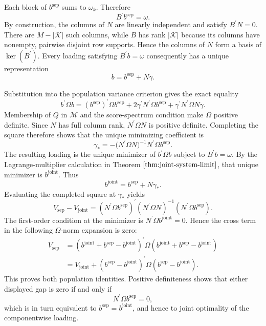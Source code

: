 Each block of \(b^{\mathrm{sep}}\) sums to \(\omega_k\). Therefore
\[
B^{\prime}b^{\mathrm{sep}}=\omega.
\]
By construction, the columns of \(N\) are linearly independent and satisfy \(B^{\prime}N=0\). There are \(M-|\mathcal K|\) such columns, while \(B\) has rank \(|\mathcal K|\) because its columns have nonempty, pairwise disjoint row supports. Hence the columns of \(N\) form a basis of \(\ker(B^{\prime})\). Every loading satisfying \(B^{\prime}b=\omega\) consequently has a unique representation
\[
b=b^{\mathrm{sep}}+N\gamma.
\]

Substitution into the population variance criterion gives the exact equality
\[
b^{\prime}\Omega b
=(b^{\mathrm{sep}})^{\prime}\Omega b^{\mathrm{sep}}
+2\gamma^{\prime}N^{\prime}\Omega b^{\mathrm{sep}}
+\gamma^{\prime}N^{\prime}\Omega N\gamma.
\]
Membership of \(Q\) in \(\mathcal M\) and the score-spectrum condition make \(\Omega\) positive definite. Since \(N\) has full column rank, \(N^{\prime}\Omega N\) is positive definite. Completing the square therefore shows that the unique minimizing coefficient is
\[
\gamma_*=-\bigl(N^{\prime}\Omega N\bigr)^{-1}N^{\prime}\Omega b^{\mathrm{sep}}.
\]
The resulting loading is the unique minimizer of \(b^{\prime}\Omega b\) subject to \(B^{\prime}b=\omega\). By the Lagrange-multiplier calculation in Theorem \(\ref{thm:joint-system-limit}\), that unique minimizer is \(b^{\mathrm{joint}}\). Thus
\[
b^{\mathrm{joint}}=b^{\mathrm{sep}}+N\gamma_*.
\]
Evaluating the completed square at \(\gamma_*\) yields
\[
V_{\mathrm{sep}}-V_{\mathrm{joint}}
=(N^{\prime}\Omega b^{\mathrm{sep}})^{\prime}
 (N^{\prime}\Omega N)^{-1}
 (N^{\prime}\Omega b^{\mathrm{sep}}).
\]
The first-order condition at the minimizer is \(N^{\prime}\Omega b^{\mathrm{joint}}=0\). Hence the cross term in the following \(\Omega\)-norm expansion is zero:
\[
\begin{aligned}
V_{\mathrm{sep}}
&=(b^{\mathrm{joint}}+b^{\mathrm{sep}}-b^{\mathrm{joint}})^{\prime}
  \Omega
  (b^{\mathrm{joint}}+b^{\mathrm{sep}}-b^{\mathrm{joint}})\\
&=V_{\mathrm{joint}}
 +(b^{\mathrm{sep}}-b^{\mathrm{joint}})^{\prime}
   \Omega(b^{\mathrm{sep}}-b^{\mathrm{joint}}).
\end{aligned}
\]
This proves both population identities. Positive definiteness shows that either displayed gap is zero if and only if
\[
N^{\prime}\Omega b^{\mathrm{sep}}=0,
\]
which is in turn equivalent to \(b^{\mathrm{sep}}=b^{\mathrm{joint}}\), and hence to joint optimality of the componentwise loading.

